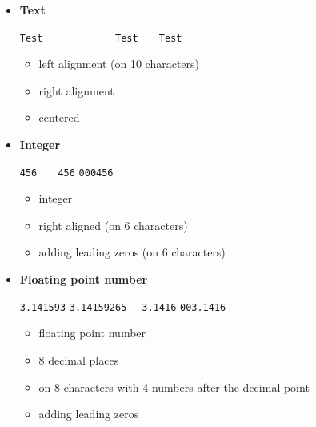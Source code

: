 \documentclass[11pt,class=report,crop=false]{standalone}
\begin{document}
\begin{itemize}
  \item \textbf{Text}
  
  \begin{center}
 \lstinline[showspaces=true]!Test      ! \qquad\qquad
    \lstinline[showspaces=true]!      Test!  \qquad\qquad
 \lstinline[showspaces=true]!   Test   !   
 \end{center}
 
  \begin{itemize}
    \item {} \quad left alignment (on 10 characters)
    \item {} \quad right alignment
    \item {} \quad centered 
  \end{itemize}

  \item \textbf{Integer}
  
  \begin{center}
 \lstinline[showspaces=true]!456! \qquad\qquad
    \lstinline[showspaces=true]!   456!  \qquad\qquad
 \lstinline[showspaces=true]!000456!   
 \end{center}
 
  \begin{itemize}
    \item {} \quad integer  
    \item {} \quad right aligned (on 6 characters)
    \item {} \quad adding leading zeros (on 6 characters)
  \end{itemize} 
  
  \item \textbf{Floating point number}
  
  \begin{center}
 \lstinline[showspaces=true]!3.141593! \qquad\qquad
    \lstinline[showspaces=true]!3.14159265!  \qquad\qquad
 \lstinline[showspaces=true]!  3.1416!  \qquad\qquad
 \lstinline[showspaces=true]!003.1416!   
 \end{center}
 
  \begin{itemize}
    \item {} \quad floating point number 
    \item {} \quad $8$ decimal places 
    \item {} \quad on $8$ characters with $4$ numbers after the decimal point 
    \item 
     \quad adding leading zeros 
  \end{itemize}   
   
\end{itemize}
\end{document}
